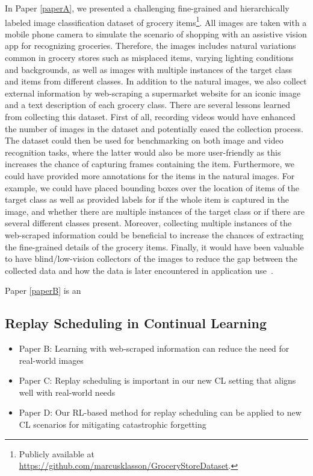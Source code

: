 In Paper \ref{paperA}, we presented a challenging fine-grained and hierarchically labeled image classification dataset of grocery items\footnote{Publicly available at \url{https://github.com/marcusklasson/GroceryStoreDataset}.}. All images are taken with a mobile phone camera to simulate the scenario of shopping with an assistive vision app for recognizing groceries. Therefore, the images includes natural variations common in grocery stores such as misplaced items, varying lighting conditions and backgrounds, as well as images with multiple instances of the target class and items from different classes. In addition to the natural images, we also collect external information by web-scraping a supermarket website for an iconic image and a text description of each grocery class. There are several lessons learned from collecting this dataset. First of all, recording videos would have enhanced the number of images in the dataset and potentially eased the collection process. The dataset could then be used for benchmarking on both image and video recognition tasks, where the latter would also be more user-friendly as this increases the chance of capturing frames containing the item. Furthermore, we could have provided more annotations for the items in the natural images. For example, we could have placed bounding boxes over the location of items of the target class as well as provided labels for if the whole item is captured in the image, and whether there are multiple instances of the target class or if there are several different classes present. Moreover, collecting multiple instances of the web-scraped information could be beneficial to increase the chances of extracting the fine-grained details of the grocery items. Finally, it would have been valuable to have blind/low-vision collectors of the images to reduce the gap between the collected data and how the data is later encountered in application use~\cite{theodorou2021disability}. 

Paper \ref{paperB} is an 


\subsection{Replay Scheduling in Continual Learning}

\begin{itemize}
	\item Paper B: Learning with web-scraped information can reduce the need for real-world images
	\item Paper C: Replay scheduling is important in our new CL setting that aligns well with real-world needs
	\item Paper D: Our RL-based method for replay scheduling can be applied to new CL scenarios for mitigating catastrophic forgetting
\end{itemize}



